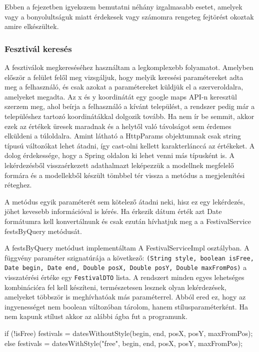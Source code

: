 
Ebben a fejezetben igyekszem bemutatni néhány izgalmasabb esetet, amelyek vagy a bonyolultságuk miatt érdekesek vagy számomra rengeteg fejtörést okoztak amire elkészültek.

\subsubsection{Fesztivál keresés}
A fesztiválok megkereséséhez használtam a legkomplexebb folyamatot. Amelyben először a felület felől meg vizsgáljuk, hogy melyik keresési paramétereket adta meg a felhasználó, és csak azokat a paramétereket küldjük el a szerveroldalra, amelyeket megadta. Az x és y koordinátát egy google maps API-n keresztül szerzem meg, ahol beírja a felhasználó a kívánt települést, a rendszer pedig már a településhez tartozó koordinátákkal dolgozik tovább. Ha nem ír be semmit, akkor ezek az értékek üresek maradnak és a helytől való távolságot sem érdemes elküldeni a túloldalra. Amint látható a HttpParams objektumnak csak string típusú változókat lehet átadni, így cast-olni kellett karakterlánccá az értékeket. A dolog érdekessége, hogy a Spring oldalon ki lehet venni más típusként is.
A lekérdezésből visszaérkezett adathalmazt leképezzük a modellnek megfelelő formára és a modellekből készült tömbbel tér vissza a metódus a megjelenítési réteghez.

A metódus egyik paraméterét sem kötelező átadni neki, hisz ez egy lekérdezés, jöhet kevesebb információval is kérés. Ha érkezik dátum érték azt Date formátumra kell konvertálnunk és csak ezután hívhatjuk meg a a FestivalService festsByQuery metódusát.

A festsByQuery metódust implementáltam A FestivalServiceImpl osztályban. A függvény paraméter szignatúrája a következő: \texttt{(String style, boolean isFree, Date begin, Date end, Double posX, Double posY, Double maxFromPos)} a visszatérési értéke egy \texttt{FestivalDTO} lista. A rendszert minden egyes lehetséges kombinációra fel kell készíteni, természetesen lesznek olyan lekérdezések, amelyeket többször is meghívhatóak más paraméterrel. Abból ered ez, hogy az ingyenességet nem boolean változóban tárolom, hanem stílusparaméterként.
Ha nem kapunk stílust akkor az alábbi ágba fut a programunk.

\begin{java}
if (!isFree) {
festivals = datesWithoutStyle(begin, end, posX, posY, 
maxFromPos);
} else {
    festivals = datesWithStyle("free", begin, end, posX, posY,
    maxFromPos);
}
\end{java}

